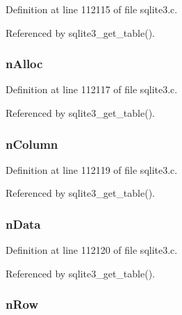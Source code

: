 Definition at line 112115 of file sqlite3.\+c.



Referenced by sqlite3\+\_\+get\+\_\+table().

\hypertarget{struct_tab_result_ab29b3b053096207217eb8b705a8b4816}{}
\subsubsection[{n\+Alloc}]{ n\+Alloc}\label{struct_tab_result_ab29b3b053096207217eb8b705a8b4816}


Definition at line 112117 of file sqlite3.\+c.



Referenced by sqlite3\+\_\+get\+\_\+table().

\hypertarget{struct_tab_result_a98026c67ef3ea63d22c20128486e35d5}{}
\subsubsection[{n\+Column}]{ n\+Column}\label{struct_tab_result_a98026c67ef3ea63d22c20128486e35d5}


Definition at line 112119 of file sqlite3.\+c.



Referenced by sqlite3\+\_\+get\+\_\+table().

\hypertarget{struct_tab_result_aa183c5f7ed54095839152f360ea79208}{}
\subsubsection[{n\+Data}]{ n\+Data}\label{struct_tab_result_aa183c5f7ed54095839152f360ea79208}


Definition at line 112120 of file sqlite3.\+c.



Referenced by sqlite3\+\_\+get\+\_\+table().

\hypertarget{struct_tab_result_abe7279928404d340672677e1d5bdf46f}{}
\subsubsection[{n\+Row}]{ n\+Row}\label{struct_tab_result_abe7279928404d340672677e1d5bdf46f}


